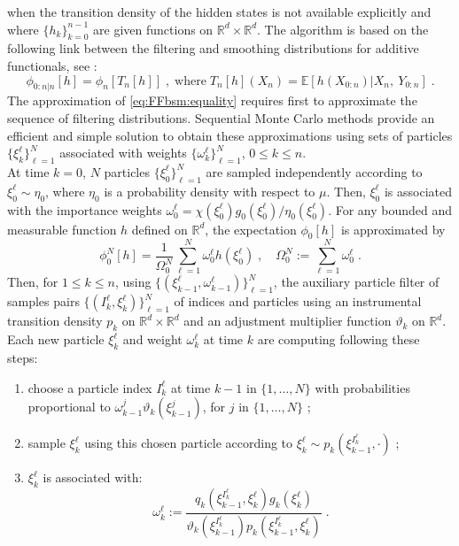 \documentclass[12pt,draft]{article}
\newcommand{\eqsp}{\;}
\newcommand{\1}{\mathrm{1}}
\newcommand{\E}{\mathbb{E}}
\newcommand{\qk}{q_{k}}
\begin{document}
when the transition density of the hidden states is not available explicitly and where $\{h_k\}_{k=0}^{n-1}$ are given functions on $\mathbb{R}^d\times \mathbb{R}^d$. 
The algorithm is based on the following link between the filtering and smoothing distributions for additive functionals, see \cite{olsson:westerborn:2016}:
\begin{equation}
\phi_{0:n|n}[h] = \phi_n[T_n[h]]\eqsp,\;\mbox{where}\; T_n[h](X_n) = \E\left[h(X_{0:n})\vert X_n,~Y_{0:n}\right]\eqsp.\label{eq:FFbsm:equality}
\end{equation}
The approximation of \eqref{eq:FFbsm:equality} requires first to approximate the sequence of filtering distributions. 
Sequential Monte Carlo methods provide an efficient and simple solution to obtain these approximations using sets of particles $\{\xi^{\ell}_k\}_{\ell=1}^N$ associated with weights $\{\omega^{\ell}_k\}_{\ell=1}^N$, $0\le k \le n$.\\
At time $k = 0$, $N$ particles $\{\xi^{\ell}_0\}_{\ell=1}^N$ are sampled independently according to  $\xi^{\ell}_0 \sim \eta_0$, where $\eta_0$ is a probability density with respect to $\mu$. 
Then, $\xi^{\ell}_0$ is associated with the importance weights $\omega_0^{\ell} = \chi(\xi^{\ell}_0)g_0 (\xi^{\ell}_0)/\eta_0(\xi^{\ell}_0)$. 
For any bounded and measurable function $h$ defined on $\mathbb{R}^d$, the expectation $\phi_{0}[h] $ is approximated by
\[
\phi^N_{0}[h] = \frac{1}{\Omega_0^N} \sum_{\ell=1}^N \omega_0^{\ell} h \left(\xi^{\ell}_0 \right)\eqsp, \quad \Omega_0^N:= \sum_{\ell=1}^N \omega_0^{\ell}\eqsp.
\]
Then, for $1\le k \le n$, using $\{(\xi^{\ell}_{k-1},\omega^{\ell}_{k-1})\}_{\ell=1}^N$, the auxiliary particle filter of \cite{pitt:shephard:1999} samples pairs $\{(I^{\ell}_k,\xi^{\ell}_{k})\}_{\ell=1}^N$ of indices and particles using an instrumental transition density $p_k$ on $\mathbb{R}^d\times \mathbb{R}^d$ and an adjustment multiplier function $\vartheta_k$ on $\mathbb{R}^d$. Each new particle $\xi^{\ell}_{k}$ and weight $\omega^{\ell}_k$ at time $k$ are computing following these steps:
\begin{enumerate}[-]
\item choose a particle index $I^{\ell}_k$ at time $k-1$ in $\{1,\ldots,N\}$ with probabilities proportional to $\omega_{k-1}^{j} \vartheta_k (\xi^{j}_{k-1})$, for $j$ in $\{1,\ldots,N\}$ ;
\item sample  $\xi^{\ell}_{k}$ using this chosen particle according to $\xi^{\ell}_{k} \sim p_k(\xi^{I^{\ell}_k}_{k-1},\cdot)$ ; 
\item $\xi^{\ell}_k$ is associated with:
\begin{equation}
\label{eq:importance:weights}
\omega^{\ell}_k := \frac{\qk(\xi_{k-1}^{I^{\ell}_k},\xi^{\ell}_k)g_k(\xi^{\ell}_k)}{\vartheta_k(\xi^{I^{\ell}_k}_{k-1}) p_k (\xi_{k-1}^{I^{\ell}_k},\xi^{\ell}_k)}\eqsp.
\end{equation}
\end{enumerate} 
\end{document}
